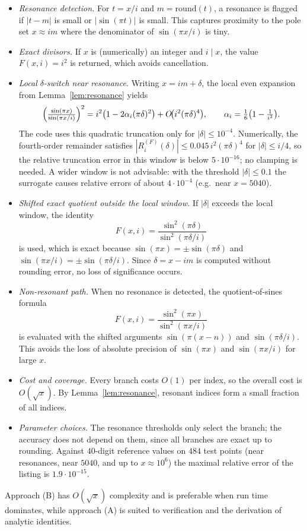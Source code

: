 \begin{itemize}
\item \emph{Resonance detection.} For $t=x/i$ and $m=\mathrm{round}(t)$, a resonance is flagged if $\lvert t-m\rvert$ is small or $\lvert\sin(\pi t)\rvert$ is small. This captures proximity to the pole set $x\approx im$ where the denominator of $\sin(\pi x/i)$ is tiny.

\item \emph{Exact divisors.} If $x$ is (numerically) an integer and $i\mid x$, the value $F(x,i)=i^2$ is returned, which avoids cancellation.

\item \emph{Local $\delta$-switch near resonance.} Writing $x=im+\delta$, the local even expansion from Lemma~\ref{lem:resonance} yields
\[
\Bigl(\tfrac{\sin(\pi x)}{\sin(\pi x/i)}\Bigr)^{2}
= i^{2}\bigl(1-2\alpha_i(\pi\delta)^{2}\bigr)+O\!\bigl(i^{2}(\pi\delta)^{4}\bigr),
\qquad \alpha_i=\tfrac16\bigl(1-\tfrac{1}{i^{2}}\bigr).
\]
The code uses this quadratic truncation only for $\lvert\delta\rvert\le10^{-4}$. Numerically, the fourth-order remainder satisfies $|R_i^{(F)}(\delta)|\le 0.045\,i^2(\pi\delta)^4$ for $|\delta|\le i/4$, so the relative truncation error in this window is below $5\cdot10^{-16}$; no clamping is needed. A wider window is not advisable: with the threshold $|\delta|\le0.1$ the surrogate causes relative errors of about $4\cdot10^{-4}$ (e.g.\ near $x=5040$).

\item \emph{Shifted exact quotient outside the local window.} If $\lvert\delta\rvert$ exceeds the local window, the identity
\[
F(x,i)=\frac{\sin^{2}(\pi\delta)}{\sin^{2}(\pi\delta/i)}
\]
is used, which is exact because $\sin(\pi x)=\pm\sin(\pi\delta)$ and $\sin(\pi x/i)=\pm\sin(\pi\delta/i)$. Since $\delta=x-im$ is computed without rounding error, no loss of significance occurs.

\item \emph{Non-resonant path.} When no resonance is detected, the quotient-of-sines formula
\[
F(x,i)=\frac{\sin^{2}(\pi x)}{\sin^{2}(\pi x/i)}
\]
is evaluated with the shifted arguments $\sin(\pi(x-n))$ and $\sin(\pi\delta/i)$. This avoids the loss of absolute precision of $\sin(\pi x)$ and $\sin(\pi x/i)$ for large $x$.

\item \emph{Cost and coverage.} Every branch costs $O(1)$ per index, so the overall cost is $O(\sqrt{x})$. By Lemma~\ref{lem:resonance}, resonant indices form a small fraction of all indices.

\item \emph{Parameter choices.} The resonance thresholds only select the branch; the accuracy does not depend on them, since all branches are exact up to rounding. Against $40$-digit reference values on $484$ test points (near resonances, near $5040$, and up to $x\approx10^6$) the maximal relative error of the listing is $1.9\cdot10^{-15}$.
\end{itemize}

\smallskip
Approach (B) has $O(\sqrt{x})$ complexity and is preferable when run time dominates, while approach (A) is suited to verification and the derivation of analytic identities.



